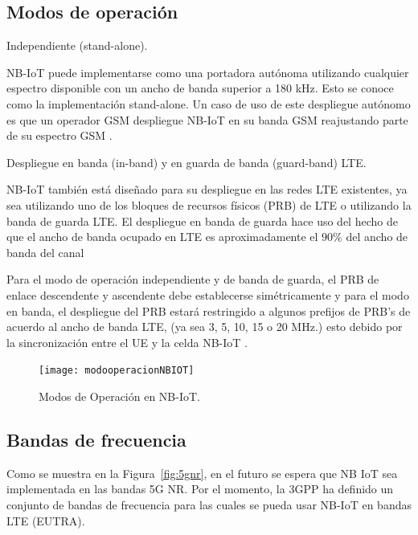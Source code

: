\subsection{Modos de operación}

Independiente (stand-alone).\newline

NB-IoT puede implementarse como una portadora autónoma utilizando cualquier espectro disponible con un ancho de banda superior a 180 kHz. Esto se conoce como la implementación stand-alone. Un caso de uso de este despliegue autónomo es que un operador GSM despliegue NB-IoT en su banda GSM reajustando parte de su espectro GSM \parencite{Liberg2018}.\newline

Despliegue en banda (in-band) y en guarda de banda (guard-band) LTE.\newline

NB-IoT también está diseñado para su despliegue en las redes LTE existentes, ya sea utilizando uno de los bloques de recursos físicos (PRB) de LTE o utilizando la banda de guarda LTE. El despliegue en banda de guarda hace uso del hecho de que el ancho de banda ocupado en LTE es aproximadamente el $90\%$ del ancho de banda del canal\newline

Para el modo de operación independiente y de banda de guarda, el PRB de enlace descendente y ascendente debe establecerse simétricamente y para el modo en banda, el despliegue del PRB estará restringido a algunos prefijos de PRB’s de acuerdo al ancho de banda LTE, (ya sea 3, 5, 10, 15 o 20 MHz.) esto debido por la sincronización entre el UE y la celda NB-IoT \parencite{NBIoTDeploymentGSMA}.

\begin{figure}[th]
    \centering
    \texttt{[image: modooperacionNBIOT]}
    \decoRule
    \caption[Modos de Operación en NB-IoT.]{Modos de Operación en NB-IoT. \parencite{Liberg2018}}
    \label{fig:NBIoT2}
\end{figure}

\subsection{Bandas de frecuencia}

Como se muestra en la Figura~\ref{fig:5gnr}, en el futuro se espera que NB IoT sea implementada en las bandas 5G NR. Por el momento, la 3GPP ha definido un conjunto de bandas de frecuencia para las cuales se pueda usar NB-IoT en bandas LTE (EUTRA). \newline

